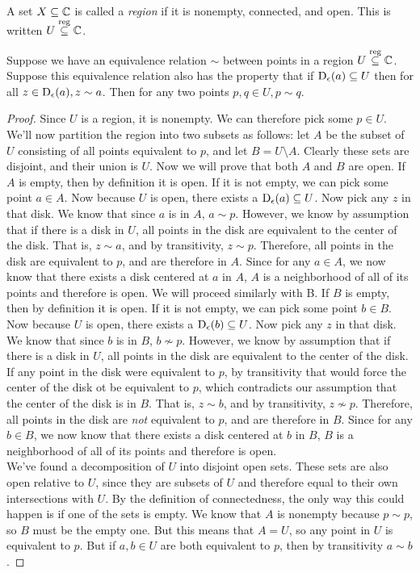 \begin{definition}[Region]
A set $X \subseteq \mathbb{C}$ is called a \emph{region} if it is nonempty, connected, and open. This is written ${U}\overset{\text{reg}}{\subseteq}\mathbb{C}$.
\end{definition}
\begin{theorem}
Suppose we have an equivalence relation $\sim$ between points in a region ${U}\overset{\text{reg}}{\subseteq}\mathbb{C}$. Suppose this equivalence relation also has the property that if $\operatorname{D_{\epsilon}} ({a}) \subseteq U$ then for all $z \in \operatorname{D_{\epsilon}} ({a}), z\sim a$. Then for any two points $p,q \in U, p\sim q$.
\end{theorem}
\begin{proof}
Since $U$ is a region, it is nonempty. We can therefore pick some $p \in U$. We'll now partition the region into two subsets as follows: let $A$ be the subset of $U$ consisting of all points equivalent to $p$, and let $B = U \setminus A$. Clearly these sets are disjoint, and their union is $U$. Now we will prove that both $A$ and $B$ are open.
If $A$ is empty, then by definition it is open. If it is not empty, we can pick some point $a \in A$. Now because $U$ is open, there exists a $\operatorname{D_{\epsilon}} ({a}) \subseteq U$. Now pick any $z$ in that disk. We know that since $a$ is in $A$, $a \sim p$. However, we know by assumption that if there is a disk in $U$, all points in the disk are equivalent to the center of the disk. That is, $z \sim a$, and by transitivity, $z \sim p$. Therefore, all points in the disk are equivalent to $p$, and are therefore in $A$. Since for any $a \in A$, we now know that there exists a disk centered at $a$ in $A$, $A$ is a neighborhood of all of its points and therefore is open.
We will proceed similarly with B. If $B$ is empty, then by definition it is open. If it is not empty, we can pick some point $b \in B$. Now because $U$ is open, there exists a $\operatorname{D_{\epsilon}} ({b}) \subseteq U$. Now pick any $z$ in that disk. We know that since $b$ is in $B$, $b \not\sim p$. However, we know by assumption that if there is a disk in $U$, all points in the disk are equivalent to the center of the disk. If any point in the disk were equivalent to $p$, by transitivity that would force the center of the disk ot be equivalent to $p$, which contradicts our assumption that the center of the disk is in $B$. That is, $z \sim b$, and by transitivity, $z \not\sim p$. Therefore, all points in the disk are \emph{not} equivalent to $p$, and are therefore in $B$. Since for any $b \in B$, we now know that there exists a disk centered at $b$ in $B$, $B$ is a neighborhood of all of its points and therefore is open.\\
We've found a decomposition of $U$ into disjoint open sets. These sets are also open relative to $U$, since they are subsets of $U$ and therefore equal to their own intersections with $U$. By the definition of connectedness, the only way this could happen is if one of the sets is empty. We know that $A$ is nonempty because $p \sim p$, so $B$ must be the empty one. But this means that $A=U$, so any point in $U$ is equivalent to $p$. But if $a,b \in U$ are both equivalent to $p$, then by transitivity $a \sim b$.
\end{proof}
